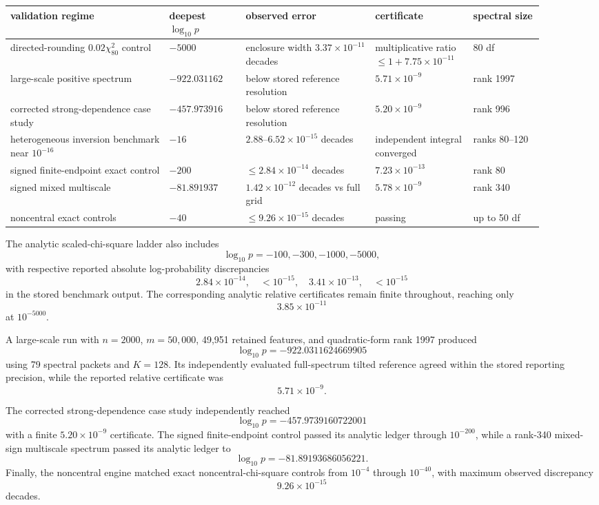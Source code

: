 \begin{center}
\small
\begin{tabular}{@{}p{0.27\linewidth}p{0.13\linewidth}p{0.22\linewidth}p{0.16\linewidth}p{0.12\linewidth}@{}}
\toprule
validation regime & deepest $\log_{10}p$ & observed error & certificate & spectral size\\
\midrule
directed-rounding $0.02\chi^2_{80}$ control
& $-5000$ & enclosure width $3.37\times10^{-11}$ decades
& multiplicative ratio $\le 1+7.75\times10^{-11}$ & 80 df\\
large-scale positive spectrum
& $-922.031162$ & below stored reference resolution & $5.71\times10^{-9}$ & rank 1997\\
corrected strong-dependence case study
& $-457.973916$ & below stored reference resolution & $5.20\times10^{-9}$ & rank 996\\
heterogeneous inversion benchmark near $10^{-16}$
& $-16$ & $2.88$--$6.52\times10^{-15}$ decades & independent integral converged & ranks 80--120\\
signed finite-endpoint exact control
& $-200$ & $\le 2.84\times10^{-14}$ decades & $7.23\times10^{-13}$ & rank 80\\
signed mixed multiscale
& $-81.891937$ & $1.42\times10^{-12}$ decades vs full grid & $5.78\times10^{-9}$ & rank 340\\
noncentral exact controls
& $-40$ & $\le 9.26\times10^{-15}$ decades & passing & up to 50 df\\
\bottomrule
\end{tabular}
\end{center}

The analytic scaled-chi-square ladder also includes
\[
\log_{10}p=-100,-300,-1000,-5000,
\]
with respective reported absolute log-probability discrepancies
\[
2.84\times10^{-14},\quad
<10^{-15},\quad
3.41\times10^{-13},\quad
<10^{-15}
\]
in the stored benchmark output.  The corresponding analytic relative certificates
remain finite throughout, reaching only
\[
3.85\times10^{-11}
\]
at \(10^{-5000}\).

A large-scale run with \(n=2000\), \(m=50{,}000\), 49,951 retained
features, and quadratic-form rank 1997 produced
\[
\boxed{\log_{10}p=-922.0311624669905}
\]
using 79 spectral packets and \(K=128\).  Its independently evaluated
full-spectrum tilted reference agreed within the stored reporting precision, while the
reported relative certificate was
\[
5.71\times10^{-9}.
\]

The corrected strong-dependence case study independently reached
\[
\boxed{\log_{10}p=-457.9739160722001}
\]
with a finite \(5.20\times10^{-9}\) certificate.  The signed finite-endpoint
control passed its analytic ledger through \(10^{-200}\), while a rank-340 mixed-sign
multiscale spectrum passed its analytic ledger to
\[
\boxed{\log_{10}p=-81.89193686056221}.
\]
Finally, the noncentral engine matched exact noncentral-chi-square controls
from \(10^{-4}\) through \(10^{-40}\), with maximum observed discrepancy
\[
9.26\times10^{-15}
\]
decades.

